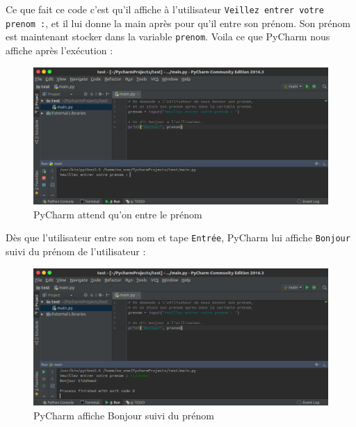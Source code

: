 \documentclass[12pt]{article}
\newcommand{\code}[1]{\colorbox{light-gray}{\texttt{#1}}}
\begin{document}
            Ce que fait ce code c'est qu'il affiche à l'utilisateur \code{Veillez entrer votre prenom :}, et il lui
            donne la main après pour qu'il entre son prénom. Son prénom est maintenant stocker dans la variable
            \code{prenom}. Voila ce que PyCharm nous affiche après l'exécution :
            \begin{figure}[H]
                \centering
                \includegraphics[width=\linewidth]{img/16_input.png}
                \caption{PyCharm attend qu'on entre le prénom}
            \end{figure}

            Dès que l'utilisateur entre son nom et tape \code{Entrée}, PyCharm lui affiche \code{Bonjour} suivi
            du prénom de l'utilisateur :
            \begin{figure}[H]
                \centering
                \includegraphics[width=\linewidth]{img/17_input.png}
                \caption{PyCharm affiche Bonjour suivi du prénom}
            \end{figure}
\end{document}
